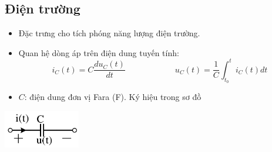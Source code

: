 \subsection{Điện trường}
\begin{itemize}
  \item Đặc trưng cho tích phóng năng lượng điện trường.
  \item Quan hệ dòng áp trên điện dung tuyến tính:
    \begin{equation}
      i_C(t) = C\frac{du_C(t)}{dt} \hspace{1in} u_C(t)=\frac{1}{C}\int_{t_0}^{t} i_C(t)dt 
    \end{equation}
  \item $C$: điện dung đơn vị Fara (F). Ký hiệu trong sơ đồ
\end{itemize}
\begin{center}
  \includegraphics[width=0.25\textwidth]{./image/6.png}
\end{center}
